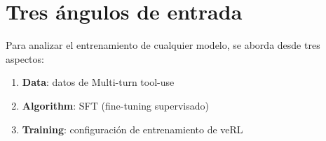 \section{Tres ángulos de entrada}
Para analizar el entrenamiento de cualquier modelo, se aborda desde tres aspectos:
\begin{enumerate}
  \item \textbf{Data}: datos de Multi-turn tool-use
  \item \textbf{Algorithm}: SFT (fine-tuning supervisado)
  \item \textbf{Training}: configuración de entrenamiento de veRL
\end{enumerate}

